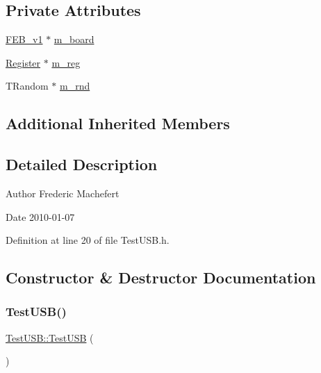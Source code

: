 \subsection*{Private Attributes}
\begin{DoxyCompactItemize}
\item 
\hyperlink{classFEB__v1}{F\+E\+B\+\_\+v1} $\ast$ \hyperlink{classTestUSB_ab4a5317f74feb30410d4c1ad75ad192c}{m\+\_\+board}
\item 
\hyperlink{classRegister}{Register} $\ast$ \hyperlink{classTestUSB_a5f2bd3ef5db056bcfd803cb94d3a6587}{m\+\_\+reg}
\item 
T\+Random $\ast$ \hyperlink{classTestUSB_ac3ad0c22af51e67455f919474a658dbe}{m\+\_\+rnd}
\end{DoxyCompactItemize}
\subsection*{Additional Inherited Members}


\subsection{Detailed Description}
\begin{DoxyAuthor}{Author}
Frederic Machefert 
\end{DoxyAuthor}
\begin{DoxyDate}{Date}
2010-\/01-\/07 
\end{DoxyDate}


Definition at line 20 of file Test\+U\+S\+B.\+h.



\subsection{Constructor \& Destructor Documentation}
\mbox{\label{classTestUSB_a4aae5a332f7484f9ef05296b638975c1}} 
\subsubsection{\texorpdfstring{Test\+U\+S\+B()}{TestUSB()}}
{\footnotesize\ttfamily \hyperlink{classTestUSB_1_1TestUSB}{Test\+U\+S\+B\+::\+Test\+U\+SB} (\begin{DoxyParamCaption}{ }\end{DoxyParamCaption})}



